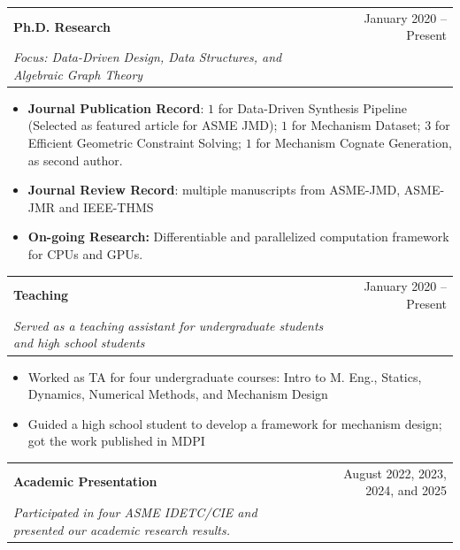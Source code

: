 \documentclass[letterpaper,10pt]{article}
\makeatletter
\newcommand{\resumeItem}[1]{
  \item\small{
    {#1 \vspace{-2pt}}
  }
}
\newcommand{\resumeSubheading}[4]{
  \vspace{-2pt}\item
    \begin{tabular*}{0.97\textwidth}[t]{l@{\extracolsep{\fill}}r}
      \textbf{#1} & #2 \\
      \textit{\small#3} & \textit{\small #4} \\
    \end{tabular*}\vspace{-7pt}
}
\newcommand{\resumeItemListStart}{\begin{itemize}}
\newcommand{\resumeItemListEnd}{\end{itemize}\vspace{-5pt}}
\makeatother
\begin{document}
    \resumeSubheading
      {Ph.D. Research}{January 2020 -- Present}
      {Focus: Data-Driven Design, Data Structures, and Algebraic Graph Theory}{}
      \resumeItemListStart
        \resumeItem{\textbf{Journal Publication Record}: $1$ for Data-Driven Synthesis Pipeline (Selected as featured article for ASME JMD); $1$ for Mechanism Dataset; $3$ for Efficient Geometric Constraint Solving; $1$ for Mechanism Cognate Generation, as second author. } 
        \resumeItem{\textbf{Journal Review Record}: multiple manuscripts from ASME-JMD, ASME-JMR and IEEE-THMS \\}
        \resumeItem{\textbf{On-going Research:} Differentiable and parallelized computation framework for CPUs and GPUs. }
      \resumeItemListEnd

    \resumeSubheading
    {Teaching}{January 2020 -- Present}{Served as a teaching assistant for undergraduate students and high school students}{}
    \resumeItemListStart
        \resumeItem{Worked as TA for four undergraduate courses: Intro to M. Eng., Statics, Dynamics, Numerical Methods, and Mechanism Design}
        \resumeItem{Guided a high school student to develop a framework for mechanism design; got the work published in MDPI}
      \resumeItemListEnd
    
    \resumeSubheading
    {Academic Presentation}{August 2022, 2023, 2024, and 2025}
    {Participated in four ASME IDETC/CIE and presented our academic research results. }{}
\end{document}
